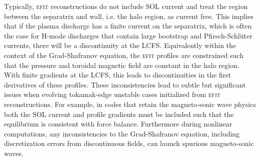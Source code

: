 \documentclass[english,aps,superscriptaddress,showkeys,showpacs,prepri,twocolumn]{revtex4}
\begin{document}
Typically, \textsc{efit} reconstructions do not include SOL current and treat
the region between the separatrix and wall, i.e. the halo region, as current
free. This implies that if the plasma discharge has a finite current on the
separatrix, which is often the case for H-mode discharges that contain large
bootstrap and Pfirsch-Schl\"uter currents, there will be a discontinuity at the
LCFS. Equivalently within the context of the Grad-Shafranov equation, the
\textsc{efit} profiles are constrained such that the pressure and toroidal
magnetic field are constant in the halo region.  With finite gradients at the
LCFS, this leads to discontinuities in the first derivatives of these profiles.
These inconsistencies lead to subtle but significant issues when evolving
tokamak-edge unstable cases initialized from \textsc{efit} reconstructions.
For example, in codes that retain the magneto-sonic wave physics both the SOL
current and profile gradients must be included such that the equilibrium is
consistent with force balance. Furthermore during nonlinear computations, any
inconsistencies to the Grad-Shafranov equation, including discretization errors
from discontinuous fields, can launch spurious magneto-sonic waves.

%

%
\end{document}
